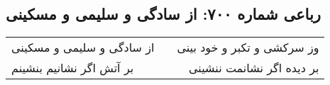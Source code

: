 \begin{center}
\section*{رباعی شماره ۷۰۰: از سادگی و سلیمی و مسکینی}
\label{sec:sh700}
\begin{longtable}{l p{0.5cm} r}
از سادگی و سلیمی و مسکینی
&&
وز سرکشی و تکبر و خود بینی
\\
بر آتش اگر نشانیم بنشینم
&&
بر دیده اگر نشانمت ننشینی
\\
\end{longtable}
\end{center}

